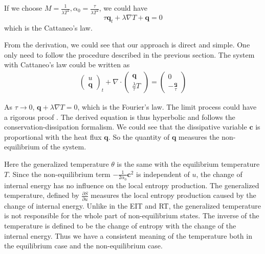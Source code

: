 \documentclass[a4paper]{article}
\begin{document}
If we choose $M=\frac{1}{\lambda T^2},\alpha_0=\frac{\tau}{\lambda T^2}$, we could have 
\begin{equation}
\tau \mathbf{q}_t + \lambda \nabla T+\mathbf{q}=0
\end{equation}
which is the Cattaneo's law.

From the derivation, we could see that our approach is direct and simple. One only need to follow the procedure described in the previous section. The system with Cattaneo's law could be written as
\begin{eqnarray}
\left( \begin{array}{ll} u \\ \mathbf{q} \end{array} \right)_t + \nabla \cdot \left( \begin{array}{ll} \mathbf{q} \\ \frac{\lambda}{\tau} T \end{array} \right) =\left( \begin{array}{ll} 0 \\ -\frac{\mathbf{q}}{\tau} \end{array} \right) 
\end{eqnarray}

As $\tau \rightarrow 0$, $\mathbf{q}+\lambda \nabla T=0$, which is the Fourier's law. The limit process could have a rigorous proof \cite{yong2008interesting}.
The derived equation is thus hyperbolic and follows the conservation-dissipation formalism. We could see that the dissipative variable $\mathbf{c}$ is proportional with the heat flux $\mathbf{q}$. So the quantity of  $\mathbf{q}$ measures the non-equilibrium of the system.

Here the generalized temperature $\theta$ is the same with the equilibrium temperature $T$. Since the non-equilibrium term $-\frac{1}{2\alpha_0}\mathbf{c}^2$ is independent of $u$, the change of internal energy has no influence on the local entropy production. The generalized temperature, defined by $\frac{\partial S}{\partial u}$ measures the local entropy production caused by the change of internal energy. Unlike in the EIT and RT, the generalized temperature is not responsible for the whole part of non-equilibrium states. The inverse of the temperature is defined to be the change of entropy with the change of the internal energy. Thus we have a consistent meaning of the temperature both in the equilibrium case and the non-equilibrium case.
\end{document}
